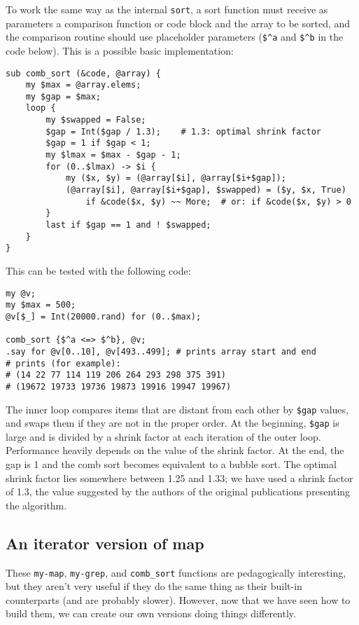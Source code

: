 To work the same way as the internal {\tt sort}, a sort 
function must receive as parameters a comparison function 
or code block and the array to be sorted, and the 
comparison routine should use placeholder parameters (\verb'$^a' 
and  \verb'$^b' in the code below). This is a possible 
basic implementation:

\begin{verbatim}
sub comb_sort (&code, @array) {
    my $max = @array.elems;
    my $gap = $max;
    loop {
        my $swapped = False;
        $gap = Int($gap / 1.3);    # 1.3: optimal shrink factor
        $gap = 1 if $gap < 1;
        my $lmax = $max - $gap - 1;
        for (0..$lmax) -> $i {
            my ($x, $y) = (@array[$i], @array[$i+$gap]);
            (@array[$i], @array[$i+$gap], $swapped) = ($y, $x, True)
                if &code($x, $y) ~~ More;  # or: if &code($x, $y) > 0
        }
        last if $gap == 1 and ! $swapped;
    }
}
\end{verbatim}

This can be tested with the following code:

\begin{verbatim}
my @v;
my $max = 500;
@v[$_] = Int(20000.rand) for (0..$max);

comb_sort {$^a <=> $^b}, @v;
.say for @v[0..10], @v[493..499]; # prints array start and end
# prints (for example):
# (14 22 77 114 119 206 264 293 298 375 391)
# (19672 19733 19736 19873 19916 19947 19967)
\end{verbatim}

The inner loop compares items that are distant from each 
other by \verb'$gap' values, and swaps them if they are 
not in the proper order. At the beginning, \verb'$gap' 
is large and is divided by a shrink factor at each 
iteration of the outer loop. Performance heavily depends
on the value of the shrink factor. At the end, the gap 
is 1 and the comb sort becomes equivalent to a bubble 
sort. The optimal shrink factor lies somewhere between 1.25 
and 1.33; we have used a shrink factor of 1.3, the value 
suggested by the authors of the original publications 
presenting the algorithm.  

\subsection{An iterator version of map}

These {\tt my-map}, {\tt my-grep}, and {\tt comb\_sort} 
functions are pedagogically interesting, but they aren't 
very useful if they do the same thing as their built-in 
counterparts (and are probably slower). However, now 
that we have seen how to build them, we can create our 
own versions doing things differently.

